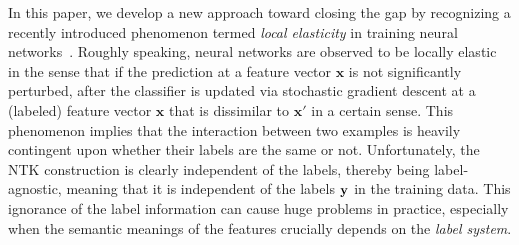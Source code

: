 
In this paper, we develop a new approach toward closing the gap by recognizing a recently introduced phenomenon termed \textit{local elasticity} in training neural networks~\citep{he2019local}. Roughly speaking, neural networks are observed to be locally elastic in the sense that if the prediction at a feature vector $\bm x$ is not significantly perturbed, after the classifier is updated via stochastic gradient descent at a (labeled) feature vector $\bm x$ that is dissimilar to $\bm x'$ in a certain sense. This phenomenon implies that the interaction between two examples is heavily contingent upon whether their labels are the same or not. Unfortunately, the NTK construction is clearly independent of the labels, thereby being label-agnostic, meaning that it is independent of the labels ${\mathbf{y}}$ in the training data. This ignorance of the label information can cause huge problems in practice, especially when the semantic meanings of the features crucially depends on the \emph{label system}. 



